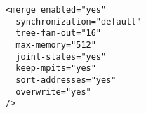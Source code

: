 \begin{verbatim}
<merge enabled="yes" 
  synchronization="default"
  tree-fan-out="16"
  max-memory="512"
  joint-states="yes"
  keep-mpits="yes"
  sort-addresses="yes"
  overwrite="yes"
/>
\end{verbatim}

